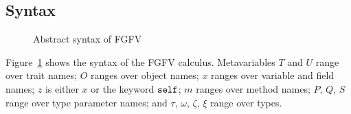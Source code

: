 \subsection{Syntax}\label{sec:grammar}
\begin{figure}[t]
\leavevmode
\small
{}
\vspace*{-.5em}
\caption{Abstract syntax of FGFV}
\label{fig:grammar}
\end{figure}

Figure~\ref{fig:grammar} shows the syntax of the FGFV calculus.
Metavariables $T$ and $U$ range over trait names;
$O$ ranges over object names;
$x$ ranges over variable and field names;
$z$ is either $x$ or the keyword $\mathrel{\mathtt{self}}$;
$m$ ranges over method names;
$P$, $Q$, $S$ range over type parameter names;
and $\tau$, $\omega$, $\zeta$, $\xi$ range over types.

